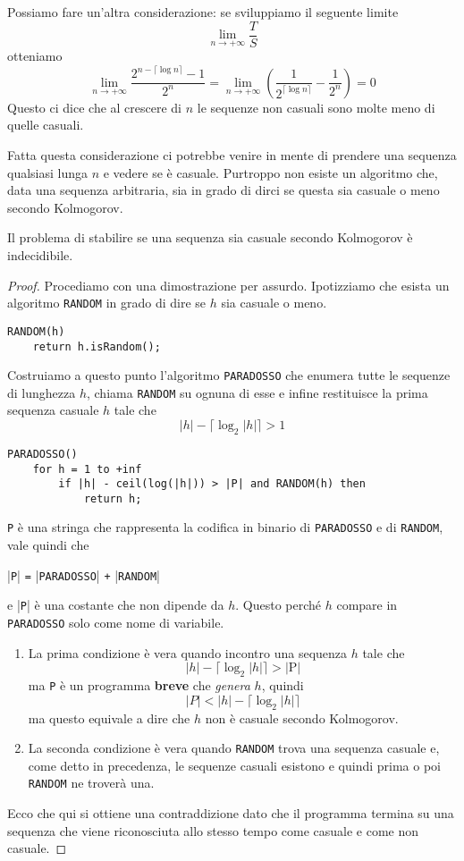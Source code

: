 Possiamo fare un'altra considerazione: se sviluppiamo il seguente limite
\[ \lim_{n \rightarrow +\infty} \frac{T}{S} \]
otteniamo
\[
	\lim_{n \rightarrow +\infty} \frac{2^{n - \lceil \log n \rceil} - 1}{2^n} =
	\lim_{n \rightarrow +\infty} \left( \frac{1}{2^{\lceil \log n \rceil}} - \frac{1}{2^n}\right) = 0
\]
Questo ci dice che al crescere di $n$ le sequenze non casuali sono molte meno di quelle casuali.

Fatta questa considerazione ci potrebbe venire in mente di prendere una sequenza qualsiasi lunga $n$ e vedere se \`e
casuale. Purtroppo non esiste un algoritmo che, data una sequenza arbitraria, sia in grado di dirci se questa sia
casuale o meno secondo Kolmogorov.

\begin{theorem}
	Il problema di stabilire se una sequenza sia casuale secondo Kolmogorov \`e indecidibile.
	\begin{proof}
		Procediamo con una dimostrazione per assurdo. Ipotizziamo che esista un algoritmo \verb|RANDOM| in grado di
		dire se $h$ sia casuale o meno.
		\begin{lstlisting}[style=pseudo-style]
RANDOM(h)
	return h.isRandom();
		\end{lstlisting}
		Costruiamo a questo punto l'algoritmo \verb|PARADOSSO| che enumera tutte le sequenze di lunghezza $h$, chiama
		\verb|RANDOM| su ognuna di esse	e infine restituisce la prima sequenza casuale $h$ tale che
		\[ |h| - \lceil \log_2 |h| \rceil > 1 \]
		\begin{lstlisting}[style=pseudo-style]
PARADOSSO()
	for h = 1 to +inf
		if |h| - ceil(log(|h|)) > |P| and RANDOM(h) then
			return h;
		\end{lstlisting}
		\verb|P| \`e una stringa che rappresenta la codifica in binario di \verb|PARADOSSO| e di \verb|RANDOM|, vale
		quindi che
		\begin{center}
			|\verb|P|| \verb|=| |\verb|PARADOSSO|| \verb|+| |\verb|RANDOM||
		\end{center}
		e |\verb|P|| \`e una costante che non dipende da $h$. Questo perch\'e $h$ compare in \verb|PARADOSSO| solo come
		nome di variabile.

		\begin{enumerate}
			\item La prima condizione \`e vera quando incontro una sequenza $h$ tale che
			      \[ |h| - \lceil \log_2 |h| \rceil > |\text{P}| \]
			      ma \verb|P| \`e un programma \textbf{breve} che \emph{genera} $h$, quindi
			      \[ |P| < |h| - \lceil \log_2 |h| \rceil \]
			      ma questo equivale a dire che $h$ non \`e casuale secondo Kolmogorov.
			\item La seconda condizione \`e vera quando \verb|RANDOM| trova una sequenza casuale e, come detto in
			      precedenza, le sequenze casuali esistono e quindi prima o poi \verb|RANDOM| ne trover\`a una.
		\end{enumerate}
		Ecco che qui si ottiene una contraddizione dato che il programma termina su una sequenza che viene riconosciuta
		allo stesso tempo come casuale e come non casuale.
	\end{proof}
\end{theorem}

